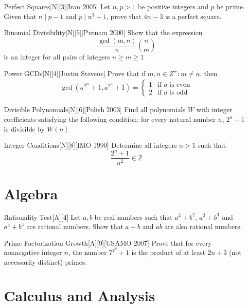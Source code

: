 \begin{problem}{Perfect Squares}[N][3][Iran 2005]
    Let $n,p>1$ be positive integers and $p$ be prime. Given that $n \mid p-1$ and $p \mid n^3-1$, prove that $4n-3$ is a perfect square.
\end{problem}

\begin{problem}{Binomial Divisibility}[N][5][Putnam 2000]
    Show that the expression 
    $$ \frac{\gcd(m,n)}{n} \binom{n}{m} $$
    is an integer for all pairs of integers $n \geq m \geq 1$
\end{problem}

\begin{problem}{Power GCDs}[N][4][Justin Stevens]
    Prove that if $m,n \in Z^+: m \neq n$, then
    \begin{align*}
        \gcd \left(a^{2^m}+1, a^{2^n}+1\right) = 
        \begin{cases}
            1 & \text{if } a \text{ is even} \\
            2 & \text{if } a \text{ is odd}
        \end{cases}
    \end{align*}
\end{problem}

\begin{problem}{Divisible Polynomials}[N][6][Polish 2003]
    Find all polynomials $W$ with integer coefficients satisfying the following condition: for every natural number $n$, $2^n-1$ is divisible by $W(n)$
\end{problem}

\begin{problem}{Integer Conditions}[N][8][IMO 1990]
    Determine all integers $n>1$ such that
    $$\frac{2^n+1}{n^2} \in \mathbb{Z}$$
\end{problem}

\section{Algebra}

\begin{problem}{Rationality Test}[A][4]
    Let $a,b$ be real numbers such that  $a^2+b^2$, $a^3+b^3$ and $a^4+b^4$ are rational numbers. Show that $a+b$ and $ab$ are also rational numbers.
\end{problem}

\begin{problem}{Prime Factorization Growth}[A][9][USAMO 2007]
    Prove that for every nonnegative integer $n$, the number $7^{7^n}+1$ is the product of at least $2n + 3$ (not necessarily distinct) primes.
\end{problem}


\section{Calculus and Analysis}




